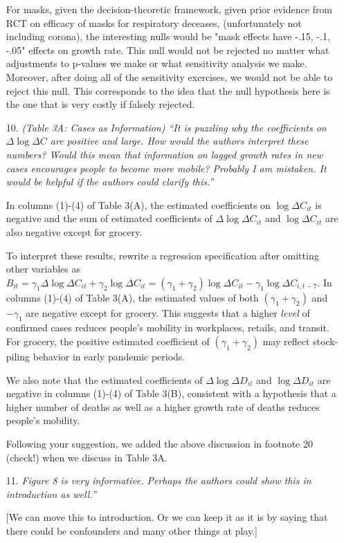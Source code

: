 \documentclass[11pt]{article}
\begin{document}
\begin{itemize}
 For masks, given the decision-theoretic framework, given prior evidence from RCT on efficacy of masks for respiratory deceases, (unfortunately not including corona), the interesting nulls would be "mask effects  have -.15, -.1, -.05" effects on growth rate. This null would not be  rejected no matter what adjustments to p-values we make or what sensitivity analysis we make.  Moreover, after doing all of the sensitivity exercises, we would not be able to reject this null.   This corresponds to the idea that the null hypothesis
 here is the one that is very costly if falsely rejected.



  
\item[10.]  \textit{(Table 3A: Cases as Information) ``It is puzzling why the coefficients on  $\Delta\log\Delta C$ are positive
and large. How would the authors interpret these numbers? Would this mean that information
on lagged growth rates in new cases encourages people to become more mobile?
Probably I am mistaken. It would be helpful if the authors could clarify this.''}

In columns (1)-(4) of Table 3(A), the estimated coefficients on $\log\Delta C_{it}$ is negative and the sum of estimated coefficients of $\Delta \log\Delta C_{it} $ and $\log\Delta C_{it}$ are also negative except for grocery.

To interpret these results, rewrite a regression specification after omitting other variables as 
$B_{it} =  \gamma_1 \Delta \log\Delta C_{it} + \gamma_2   \log\Delta C_{it} =  (\gamma_1 +\gamma_2) \log\Delta C_{it} - \gamma_1   \log\Delta C_{i,t-7}$.
In columns (1)-(4) of Table 3(A),  the estimated values of both $(\gamma_1 +\gamma_2)$ and $-\gamma_1$ are negative except for grocery. This suggests that  a higher \textit{level} of confirmed cases reduces people's mobility in workplaces, retails, and transit. For grocery, the positive estimated coefficient of $(\gamma_1 +\gamma_2)$ may reflect stock-piling behavior in early pandemic periods.
  
 We also note that the estimated coefficients of  $\Delta \log\Delta D_{it} $ and $\log\Delta D_{it}$ are negative in columns (1)-(4) of  Table 3(B), consistent with a hypothesis that a higher number of deaths as well as a higher growth rate of deaths reduces people's mobility.
 
Following your suggestion, we added the above discussion in footnote 20 (check!) when we discuss in Table 3A.


\item[11.]  \textit{Figure 8 is very informative. Perhaps the authors could show this in introduction as well.''}

[We can move this to introduction. Or we can keep it as it is by saying that there could be confounders and many other things at play.]
  
  \end{itemize}
  
\end{document}
